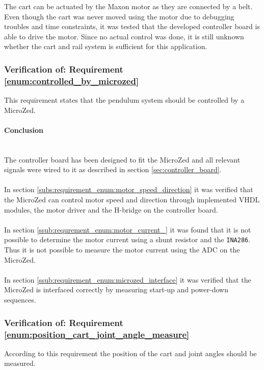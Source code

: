 The cart can be actuated by the Maxon motor as they are connected by a belt. 
Even though the cart was never moved using the motor due to debugging troubles and time constraints, it was tested that the developed controller board is able to drive the motor.
Since no actual control was done, it is still unknown whether the cart and rail system is sufficient for this application.

\subsubsection{Verification of: Requirement \ref{enum:controlled_by_microzed}} %
\label{sub:verification_of_requirement_enum:controlled_by_microzed}
This requirement states that the pendulum system should be controlled by a MicroZed.

\paragraph{Conclusion}~\\
The controller board has been designed to fit the MicroZed and all relevant signals were wired to it as described in section \ref{sec:controller_board}.
\\~\\
In section \ref{subs:requirement_enum:motor_speed_direction} it was verified that the MicroZed can control motor speed and direction through implemented VHDL modules, the motor driver and the H-bridge on the controller board. 
\\~\\
In section \ref{ssub:requrement_enum:motor_current_} it was found that it is not possible to determine the motor current using a shunt resistor and the \texttt{INA286}. 
Thus it is not possible to measure the motor current using the ADC on the MicroZed.
\\~\\
In section \ref{ssub:requirement_enum:microzed_interface} it was verified that the MicroZed is interfaced correctly by measuring start-up and power-down sequences.



\subsubsection{Verification of: Requirement \ref{enum:position_cart_joint_angle_measure}} %
\label{sub:verification_of_requirement_enum:position_cart_joint_angle_measure}
According to this requirement the position of the cart and joint angles should be measured.

